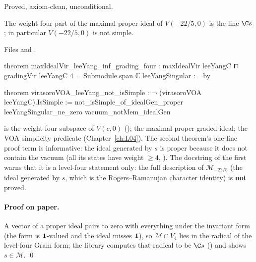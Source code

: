 \begin{status}
Proved, axiom-clean, unconditional.
\end{status}

\begin{theorem}\label{l19:thm:lylevel4}
The weight-four part of the maximal proper ideal of $V(-22/5,0)$ is the line $\C s$; in particular
$V(-22/5,0)$ is not simple.
\end{theorem}

\noindent Files  and
.
\begin{leancode}
theorem maxIdealVir_leeYang_inf_grading_four :
    maxIdealVir leeYangC ⊓ gradingVir leeYangC 4 = Submodule.span ℂ {leeYangSingular} := by

theorem virasoroVOA_leeYang_not_isSimple : ¬ (virasoroVOA leeYangC).IsSimple :=
  not_isSimple_of_idealGen_proper leeYangSingular_ne_zero vacuum_notMem_idealGen
\end{leancode}

\begin{dictionary}
 is the weight-four subspace of $V(c,0)$ ();
 the maximal proper graded ideal;  the VOA simplicity
predicate (Chapter~\ref{ch:L04}). The second theorem's one-line proof term is informative: the ideal
generated by $s$ is proper because it does not contain the vacuum (all its states have weight
$\ge4$, ). The docstring of the first warns that it is a level-four
statement only: the full description of $\mathcal M_{-22/5}$ (the ideal generated by $s$, which is the
Rogers--Ramanujan character identity) is \textbf{not} proved.
\end{dictionary}

\paragraph{Proof on paper.} A vector of a proper ideal pairs to zero with everything under the
invariant form (the form is $\mathbf{1}$-valued and the ideal misses $\mathbf{1}$), so
$\mathcal M\cap V_4$ lies in the radical of the level-four Gram form; the library computes that radical to
be $\C s$ (\allowbreak{}\allowbreak{}\allowbreak{}\allowbreak{}) and shows $s\in\mathcal M$. \qed

